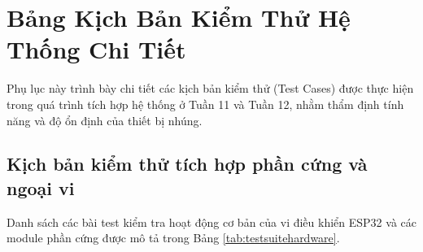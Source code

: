 \chapter{Bảng Kịch Bản Kiểm Thử Hệ Thống Chi Tiết}
\label{app:testcases}

Phụ lục này trình bày chi tiết các kịch bản kiểm thử (Test Cases) được thực hiện trong quá trình tích hợp hệ thống ở Tuần 11 và Tuần 12, nhằm thẩm định tính năng và độ ổn định của thiết bị nhúng.

\section{Kịch bản kiểm thử tích hợp phần cứng và ngoại vi}
Danh sách các bài test kiểm tra hoạt động cơ bản của vi điều khiển ESP32 và các module phần cứng được mô tả trong Bảng \ref{tab:testsuitehardware}.

